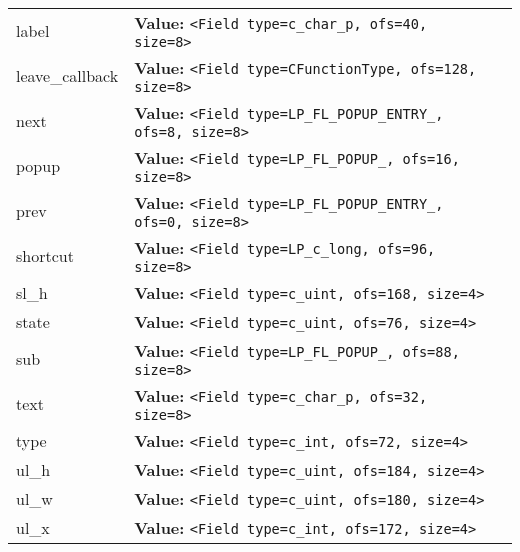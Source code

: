 \begin{longtable}{|p{\varnamewidth}|p{\vardescrwidth}|l}
\cline{1-2}
\raggedright l\-a\-b\-e\-l\- & \raggedright \textbf{Value:} 
{\tt {\textless}Field type=c\_char\_p, ofs=40, size=8{\textgreater}}&\\
\cline{1-2}
\raggedright l\-e\-a\-v\-e\-\_\-c\-a\-l\-l\-b\-a\-c\-k\- & \raggedright \textbf{Value:} 
{\tt {\textless}Field type=CFunctionType, ofs=128, size=8{\textgreater}}&\\
\cline{1-2}
\raggedright n\-e\-x\-t\- & \raggedright \textbf{Value:} 
{\tt {\textless}Field type=LP\_FL\_POPUP\_ENTRY\_, ofs=8, size=8{\textgreater}}&\\
\cline{1-2}
\raggedright p\-o\-p\-u\-p\- & \raggedright \textbf{Value:} 
{\tt {\textless}Field type=LP\_FL\_POPUP\_, ofs=16, size=8{\textgreater}}&\\
\cline{1-2}
\raggedright p\-r\-e\-v\- & \raggedright \textbf{Value:} 
{\tt {\textless}Field type=LP\_FL\_POPUP\_ENTRY\_, ofs=0, size=8{\textgreater}}&\\
\cline{1-2}
\raggedright s\-h\-o\-r\-t\-c\-u\-t\- & \raggedright \textbf{Value:} 
{\tt {\textless}Field type=LP\_c\_long, ofs=96, size=8{\textgreater}}&\\
\cline{1-2}
\raggedright s\-l\-\_\-h\- & \raggedright \textbf{Value:} 
{\tt {\textless}Field type=c\_uint, ofs=168, size=4{\textgreater}}&\\
\cline{1-2}
\raggedright s\-t\-a\-t\-e\- & \raggedright \textbf{Value:} 
{\tt {\textless}Field type=c\_uint, ofs=76, size=4{\textgreater}}&\\
\cline{1-2}
\raggedright s\-u\-b\- & \raggedright \textbf{Value:} 
{\tt {\textless}Field type=LP\_FL\_POPUP\_, ofs=88, size=8{\textgreater}}&\\
\cline{1-2}
\raggedright t\-e\-x\-t\- & \raggedright \textbf{Value:} 
{\tt {\textless}Field type=c\_char\_p, ofs=32, size=8{\textgreater}}&\\
\cline{1-2}
\raggedright t\-y\-p\-e\- & \raggedright \textbf{Value:} 
{\tt {\textless}Field type=c\_int, ofs=72, size=4{\textgreater}}&\\
\cline{1-2}
\raggedright u\-l\-\_\-h\- & \raggedright \textbf{Value:} 
{\tt {\textless}Field type=c\_uint, ofs=184, size=4{\textgreater}}&\\
\cline{1-2}
\raggedright u\-l\-\_\-w\- & \raggedright \textbf{Value:} 
{\tt {\textless}Field type=c\_uint, ofs=180, size=4{\textgreater}}&\\
\cline{1-2}
\raggedright u\-l\-\_\-x\- & \raggedright \textbf{Value:} 
{\tt {\textless}Field type=c\_int, ofs=172, size=4{\textgreater}}&\\

\end{longtable}
